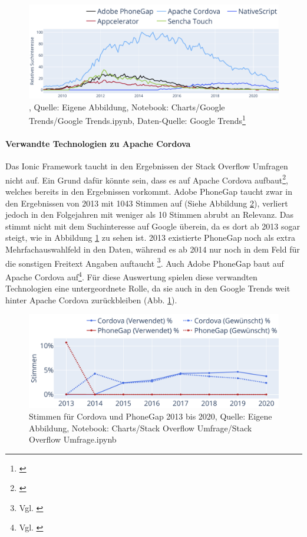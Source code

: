 \begin{figure}[H]
	\centering
    \includegraphics[width=1.0\textwidth]{Charts/Google Trends/Suchinteresse geringe Relevanz.pdf}
	\caption[]{, Quelle: Eigene Abbildung, Notebook: Charts/Google Trends/Google Trends.ipynb, Daten-Quelle: Google Trends\footnote{\cite{FaqPhoneGapDocs}}}
	\label{fig:SuchinteresseGeringeRelevanz}
\end{figure}


\paragraph{Verwandte Technologien zu Apache Cordova} Das Ionic Framework taucht in den Ergebnissen der Stack Overflow Umfragen nicht auf. Ein Grund dafür könnte sein, dass es auf Apache Cordova aufbaut\footnote{\cite{TheLastWordOnCordovaAndPhoneGap}}, welches bereits in den Ergebnissen vorkommt. Adobe PhoneGap taucht zwar in den Ergebnissen von 2013 mit 1043 Stimmen auf (Siehe Abbildung \ref{fig:CordovaUndPhoneGapStimmen}), verliert jedoch in den Folgejahren mit weniger als 10 Stimmen abrubt an Relevanz.  Das stimmt nicht mit dem Suchinteresse auf Google überein, da es dort ab 2013 sogar steigt, wie in Abbildung \ref{fig:SuchinteresseGeringeRelevanz} zu sehen ist. 2013 existierte PhoneGap noch als extra Mehrfachauswahlfeld in den Daten, während es ab 2014 nur noch in dem Feld für die sonstigen Freitext Angaben auftaucht \footnote{Vgl. \cite{StackOverflowInsights}}. Auch Adobe PhoneGap baut auf Apache Cordova auf\footnote{Vgl. \cite{FaqPhoneGapDocs}}. Für diese Auswertung spielen diese verwandten Technologien eine untergeordnete Rolle, da sie auch in den Google Trends weit hinter Apache Cordova zurückbleiben (Abb. \ref{fig:SuchinteresseGeringeRelevanz}).
 
\begin{figure}[H]
	\centering
    \includegraphics[width=1.0\textwidth]{Charts/Stack Overflow Umfrage/Cordova und PhoneGap Stimmen.pdf}
	\caption[Stimmen für Cordova und PhoneGap 2013 bis 2020]{Stimmen für Cordova und PhoneGap 2013 bis 2020, Quelle: Eigene Abbildung, Notebook: Charts/Stack Overflow Umfrage/Stack Overflow Umfrage.ipynb}
	\label{fig:CordovaUndPhoneGapStimmen}
\end{figure}
 
